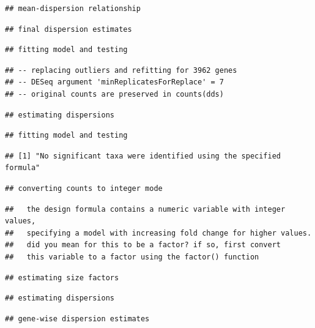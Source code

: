 \documentclass[]{article}
\begin{document}
\begin{verbatim}
## mean-dispersion relationship
\end{verbatim}

\begin{verbatim}
## final dispersion estimates
\end{verbatim}

\begin{verbatim}
## fitting model and testing
\end{verbatim}

\begin{verbatim}
## -- replacing outliers and refitting for 3962 genes
## -- DESeq argument 'minReplicatesForReplace' = 7 
## -- original counts are preserved in counts(dds)
\end{verbatim}

\begin{verbatim}
## estimating dispersions
\end{verbatim}

\begin{verbatim}
## fitting model and testing
\end{verbatim}

\begin{verbatim}
## [1] "No significant taxa were identified using the specified formula"
\end{verbatim}

\begin{verbatim}
## converting counts to integer mode
\end{verbatim}

\begin{verbatim}
##   the design formula contains a numeric variable with integer values,
##   specifying a model with increasing fold change for higher values.
##   did you mean for this to be a factor? if so, first convert
##   this variable to a factor using the factor() function
\end{verbatim}

\begin{verbatim}
## estimating size factors
\end{verbatim}

\begin{verbatim}
## estimating dispersions
\end{verbatim}

\begin{verbatim}
## gene-wise dispersion estimates
\end{verbatim}
\end{document}
